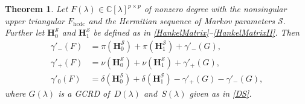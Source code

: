 \documentclass[12pt,reqno]{amsart}
\theoremstyle{plain}
\newtheorem{theorem}{Theorem}[section]
\numberwithin{equation}{section}
\theoremstyle{remark}
\begin{document}
\begin{theorem}\label{ThmInertia}
   Let $F(\lambda)\in\mathbb C[\lambda]^{p\times p}$ of nonzero degree with the nonsingular upper triangular $F_{\mathrm{hcdc}}$ and the Hermitian sequence of Markov parameters $\mathscr S$. 
Further let $
\mathbf{H}_{0}^{\mathscr S}$ and $\mathbf{H}_{1}^{\mathscr S}$ be defined as in \eqref{HankelMatrix}--\eqref{HankelMatrixII}. Then
      \begin{align*}
        \gamma'_-(F)&=\pi(\mathbf{H}_{0}^{\mathscr S})+\pi(\mathbf{H}_{1}^{\mathscr S}) +\gamma'_-(G),\\
        \gamma'_+(F)&=\nu(\mathbf{H}_{0}^{\mathscr S})+\nu(\mathbf{H}_{1}^{\mathscr S}) + \gamma'_+(G),\\
        \gamma'_0(F)&=\delta(\mathbf{H}_{0}^{\mathscr S})+\delta(\mathbf{H}_1^{\mathscr S})-\gamma'_+(G)- \gamma'_-(G),
      \end{align*}
where $G(\lambda)$ is a GCRD of~$D(\lambda)$ and~$S(\lambda)$ given as in \eqref{DS}.
\end{theorem}
\end{document}
